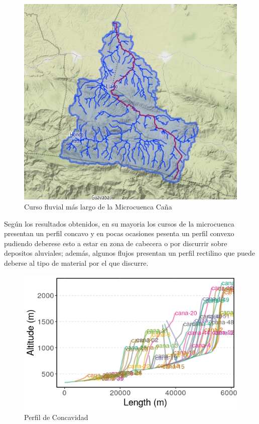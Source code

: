 \documentclass[11pt,]{article}
\begin{document}
\begin{figure}
\centering
\includegraphics{curso_mas_largo.jpeg}
\caption{Curso fluvial más largo de la Microcuenca
Caña\label{cursolargo}}
\end{figure}

Según los resultados obtenidos, en su mayoria los cursos de la
microcuenca presentan un perfil concavo y en pocas ocasiones pesenta un
perfil convexo pudiendo deberese esto a estar en zona de cabecera o por
discurrir sobre depositos aluviales; además, algunos flujos presentan un
perfil rectilino que puede deberse al tipo de material por el que
discurre.

\begin{figure}
\centering
\includegraphics{perfiles_cana.png}
\caption{Perfil de Concavidad\label{perfilconcavidad}}
\end{figure}
\end{document}
